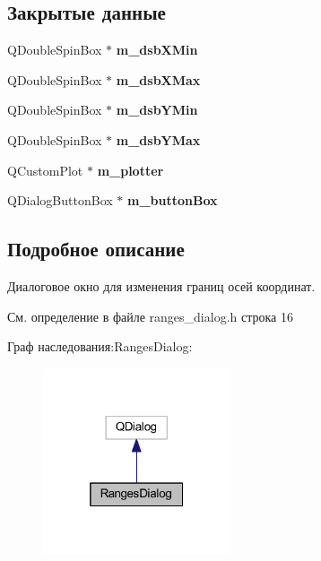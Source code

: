 \subsection*{Закрытые данные}
\begin{DoxyCompactItemize}
\item 
\hypertarget{class_ranges_dialog_aa7e90336b7f703eda2d04b74cc29b1f1}{}\label{class_ranges_dialog_aa7e90336b7f703eda2d04b74cc29b1f1} 
Q\+Double\+Spin\+Box $\ast$ {\bfseries m\+\_\+dsb\+X\+Min}
\item 
\hypertarget{class_ranges_dialog_a336a353a6730dc45cbac777808b6c368}{}\label{class_ranges_dialog_a336a353a6730dc45cbac777808b6c368} 
Q\+Double\+Spin\+Box $\ast$ {\bfseries m\+\_\+dsb\+X\+Max}
\item 
\hypertarget{class_ranges_dialog_a5ca6eae82b600f510d7e0e45bd0c254a}{}\label{class_ranges_dialog_a5ca6eae82b600f510d7e0e45bd0c254a} 
Q\+Double\+Spin\+Box $\ast$ {\bfseries m\+\_\+dsb\+Y\+Min}
\item 
\hypertarget{class_ranges_dialog_a2b993d1980494d1dcd45a9f432c04c39}{}\label{class_ranges_dialog_a2b993d1980494d1dcd45a9f432c04c39} 
Q\+Double\+Spin\+Box $\ast$ {\bfseries m\+\_\+dsb\+Y\+Max}
\item 
\hypertarget{class_ranges_dialog_a68fd573fcf8e4c35716edca9b983ee16}{}\label{class_ranges_dialog_a68fd573fcf8e4c35716edca9b983ee16} 
Q\+Custom\+Plot $\ast$ {\bfseries m\+\_\+plotter}
\item 
\hypertarget{class_ranges_dialog_abd076dcdfac169f18d61b361478fa523}{}\label{class_ranges_dialog_abd076dcdfac169f18d61b361478fa523} 
Q\+Dialog\+Button\+Box $\ast$ {\bfseries m\+\_\+button\+Box}
\end{DoxyCompactItemize}


\subsection{Подробное описание}
Диалоговое окно для изменения границ осей координат. 

См. определение в файле ranges\+\_\+dialog.\+h строка 16



Граф наследования\+:Ranges\+Dialog\+:
\nopagebreak
\begin{figure}[H]
\begin{center}
\leavevmode
\includegraphics[width=157pt]{class_ranges_dialog__inherit__graph}
\end{center}
\end{figure}



